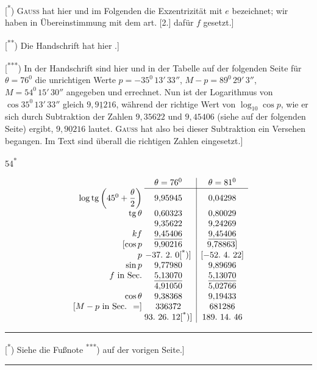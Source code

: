 {\footnotesize
\noindent\hspace*{\parindent}[\textsuperscript{*}) \textsc{Gauss} hat hier und im Folgenden die Exzentrizität mit \(e\) bezeichnet; wir haben in Übereinstimmung mit dem art. [2.] dafür \(f\) gesetzt.]\par
\noindent\hspace*{\parindent}[\textsuperscript{**}) Die Handschrift hat hier .]\par
\noindent\hspace*{\parindent}[\textsuperscript{***}) In der Handschrift sind hier und in der Tabelle auf der folgenden Seite für \(\theta=76^0\) die unrichtigen Werte \(p=-35^0\,13'\,33''\), \(M-p=89^0\,29'\,3''\), \(M=54^0\,15'\,30''\) angegeben und errechnet. Nun ist der Logarithmus von \(\cos35^0\,13'\,33''\) gleich \(9{,}9\underline{1}216\), während der richtige Wert von \(\log_{10}\cos p\), wie er sich durch Subtraktion der Zahlen \(9{,}35622\) und \(9{,}45406\) (siehe auf der folgenden Seite) ergibt, \(9{,}9\underline{0}216\) lautet. \textsc{Gauss} hat also bei dieser Subtraktion ein Versehen begangen. Im Text sind überall die richtigen Zahlen eingesetzt.]\par}
\noindent\hfill{\small 54\textsuperscript{*}}\hspace*{.1\linewidth}\par
\clearpage{}
\begingroup\setlength{\arraycolsep}{8pt}\renewcommand{\arraystretch}{1.3}
\[\begin{array}{r@{\;}c|c}
&\theta=76^0&\theta=81^0\\\cline{2-3}
\log\operatorname{tg}\left(45^0+\dfrac\theta2\right)&9{,}95945&0{,}04298\\[3pt]
\operatorname{tg}\theta&0{,}60323&0{,}80029\\
&9{,}35622&9{,}24269\\
kf&\underline{9{,}45406}&\underline{9{,}45406}\\
{}[\cos p&9{,}90216&9{,}78863]\\
p&-37.\ 2.\ 0\text{[\textsuperscript{*})]}&[-52.\ 4.\ 22]\\
\sin p&9{,}77980&9{,}89696\\
f\text{ in Sec.}&\underline{5{,}13070}&\underline{5{,}13070}\\
&4{,}91050&5{,}02766\\
\cos\theta&9{,}38368&9{,}19433\\
{}[M-p\text{ in Sec. }=]&336372&681286\\
&93.\ 26.\ 12\text{[\textsuperscript{*})]}&189.\ 14.\ 46
\end{array}\]
\endgroup
\par\noindent\rule{.25\linewidth}{.4pt}\par\smallskip
{\footnotesize\noindent\hspace*{\parindent}[\textsuperscript{*}) Siehe die Fußnote \textsuperscript{***}) auf der vorigen Seite.]\par}
\vspace{2cm}\begin{center}\rule{.32\linewidth}{.4pt}\end{center}
\clearpage\endgroup
